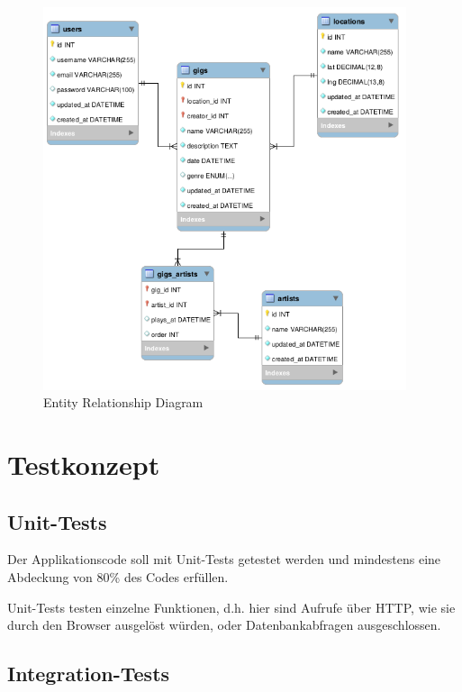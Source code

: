 \begin{figure}[!htb]
  \centering
  \includegraphics[width=0.95\textwidth]{konzept/erd.png}
  \caption{Entity Relationship Diagram}
\end{figure}


\clearpage
\section{Testkonzept}\label{testkonzept}

\subsection{Unit-Tests}\label{unittests}

Der Applikationscode soll mit Unit-Tests getestet werden und mindestens eine
Abdeckung von 80\% des Codes erfüllen.

Unit-Tests testen einzelne Funktionen, d.h. hier sind Aufrufe über HTTP, wie
sie durch den Browser ausgelöst würden, oder Datenbankabfragen ausgeschlossen.

\subsection{Integration-Tests}\label{integrationtests}

